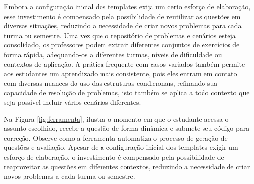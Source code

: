 Embora a configuração inicial dos templates exija um certo esforço de elaboração, esse investimento é compensado pela possibilidade de reutilizar as questões em diversas situações, reduzindo a necessidade de criar novos problemas para cada turma ou semestre. Uma vez que o repositório de problemas e cenários esteja consolidado, os professores podem extrair diferentes conjuntos de exercícios de forma rápida, adequando-os a diferentes turmas, níveis de dificuldade ou contextos de aplicação. A prática frequente com casos variados também permite aos estudantes um aprendizado mais consistente, pois eles entram em contato com diversas nuances do uso das estruturas condicionais, refinando sua capacidade de resolução de problemas, isto também se aplica a todo contexto que seja possível incluir vários cenários diferentes.



Na Figura \ref{fig:ferramenta}, ilustra o momento em que o estudante acessa o assunto escolhido, recebe a questão de forma dinâmica e submete seu código para correção. Observe como a ferramenta automatiza o processo de geração de questões e avaliação. Apesar de a configuração inicial dos templates exigir um esforço de elaboração, o investimento é compensado pela possibilidade de reaproveitar as questões em diferentes contextos, reduzindo a necessidade de criar novos problemas a cada turma ou semestre. 

 

